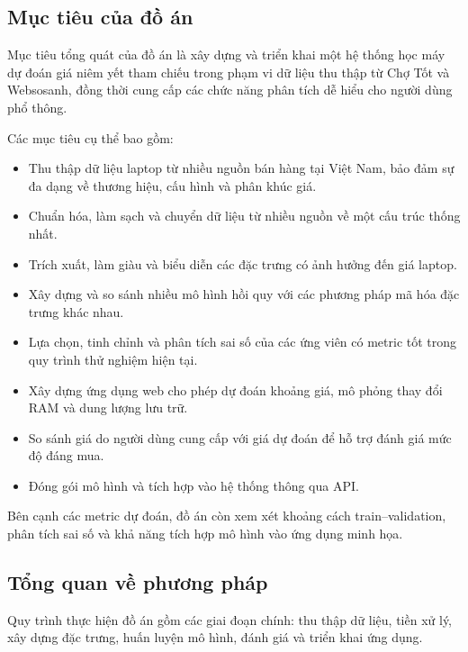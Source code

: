 \subsection{Mục tiêu của đồ án}

Mục tiêu tổng quát của đồ án là xây dựng và triển khai một hệ thống học máy dự đoán giá niêm yết tham chiếu trong phạm vi dữ liệu thu thập từ Chợ Tốt và Websosanh, đồng thời cung cấp các chức năng phân tích dễ hiểu cho người dùng phổ thông.

Các mục tiêu cụ thể bao gồm:

\begin{itemize}
    \item Thu thập dữ liệu laptop từ nhiều nguồn bán hàng tại Việt Nam, bảo đảm sự đa dạng về thương hiệu, cấu hình và phân khúc giá.
    
    \item Chuẩn hóa, làm sạch và chuyển dữ liệu từ nhiều nguồn về một cấu trúc thống nhất.
    
    \item Trích xuất, làm giàu và biểu diễn các đặc trưng có ảnh hưởng đến giá laptop.
    
    \item Xây dựng và so sánh nhiều mô hình hồi quy với các phương pháp mã hóa đặc trưng khác nhau.
    
    \item Lựa chọn, tinh chỉnh và phân tích sai số của các ứng viên có metric tốt trong quy trình thử nghiệm hiện tại.
    
    \item Xây dựng ứng dụng web cho phép dự đoán khoảng giá, mô phỏng thay đổi RAM và dung lượng lưu trữ.
    
    \item So sánh giá do người dùng cung cấp với giá dự đoán để hỗ trợ đánh giá mức độ đáng mua.
    
    \item Đóng gói mô hình và tích hợp vào hệ thống thông qua API.
\end{itemize}

Bên cạnh các metric dự đoán, đồ án còn xem xét khoảng cách train--validation, phân tích sai số và khả năng tích hợp mô hình vào ứng dụng minh họa.

\subsection{Tổng quan về phương pháp}

Quy trình thực hiện đồ án gồm các giai đoạn chính: thu thập dữ liệu, tiền xử lý, xây dựng đặc trưng, huấn luyện mô hình, đánh giá và triển khai ứng dụng.

